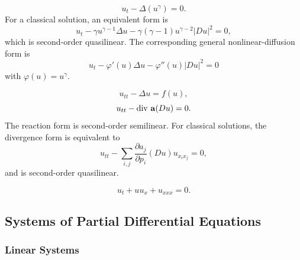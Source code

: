\begin{example}
\label{ex:porous-medium-equation}





$$u_t - \Delta(u^\gamma) = 0.$$
For a classical solution, an equivalent form is
$$u_t - \gamma u^{\gamma-1}\Delta u - \gamma(\gamma-1)u^{\gamma-2}|Du|^2 = 0,$$
which is second-order quasilinear. The corresponding general nonlinear-diffusion form is
$$u_t - \varphi'(u)\Delta u - \varphi''(u)|Du|^2 = 0$$
with $\varphi(u)=u^\gamma$.
\end{example}

\begin{example}
\label{ex:nonlinear-wave-equations}





$$u_{tt} - \Delta u = f(u),$$
$$u_{tt} - \operatorname{div}\,\mathbf{a}(Du) = 0.$$
The reaction form is second-order semilinear. For classical solutions, the
divergence form is equivalent to
$$u_{tt} - \sum_{i,j}\frac{\partial a_j}{\partial p_i}(Du)u_{x_i x_j} = 0,$$
and is second-order quasilinear.
\end{example}

\begin{example}
\label{ex:kdv-equation}





$$u_t + uu_x + u_{xxx} = 0.$$
\end{example}

\subsection{Systems of Partial Differential Equations}
\label{sec:systems-of-pdes}

\subsubsection{Linear Systems}
\label{sec:examples-linear-systems}

